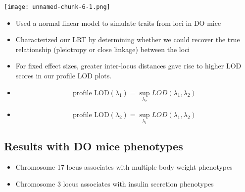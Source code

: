 \documentclass[a0,landscape]{a0poster}
\begin{document}
\begin{multicols}{4}
\begin{center}\vspace{1cm}
\texttt{[image: unnamed-chunk-6-1.png]}
\end{center}\vspace{1cm}



\begin{itemize}
\item Used a normal linear model to simulate traits from loci in DO mice
\item Characterized our LRT by determining whether we could recover the true relationship (pleiotropy or close linkage) between the loci
\item For fixed effect sizes, greater inter-locus distances gave rise to higher LOD scores in our profile LOD plots.
\item \begin{equation}
\text{profile LOD}(\lambda_1) = \sup_{\lambda_2}LOD(\lambda_1, \lambda_2)
\end{equation}
\item \begin{equation}
\text{profile LOD}(\lambda_2) = \sup_{\lambda_1}LOD(\lambda_1, \lambda_2)
\end{equation}


\end{itemize}


\subsection*{Results with DO mice phenotypes}

\begin{itemize}
\item Chromosome 17 locus associates with multiple body weight phenotypes
\item Chromosome 3 locus associates with insulin secretion phenotypes
\end{itemize}



\end{multicols}
\end{document}
